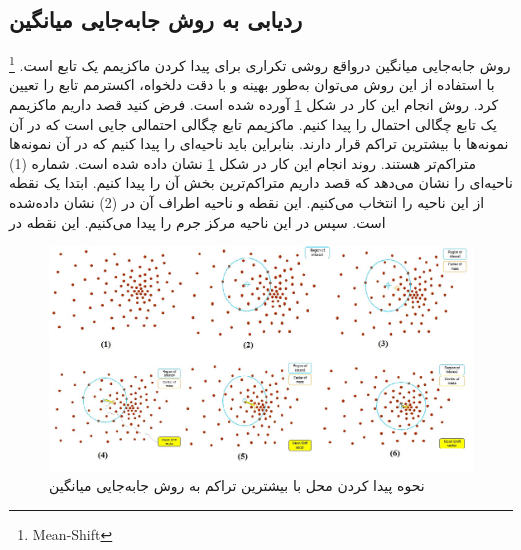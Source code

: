 \documentclass[paper=a4, fontsize=12pt]{article} %
\begin{document}
\subsection{ ردیابی به روش جابه‌جایی میانگین} 
\footnote{Mean-Shift}
روش جابه‌جایی میانگین درواقع روشی تکراری برای پیدا کردن ماکزیمم یک تابع است. با استفاده از این روش می‌توان به‌طور بهینه و با دقت دلخواه،  اکسترمم تابع را تعیین کرد. روش انجام این کار در شکل \ref{pic-3} آورده شده است.
فرض کنید قصد داریم ماکزیمم یک تابع چگالی احتمال را پیدا کنیم. ماکزیمم تابع چگالی احتمالی جایی است که در آن نمونه‌ها با بیشترین تراکم قرار دارند. بنابراین باید ناحیه‌ای را پیدا کنیم که در آن نمونه‌ها متراکم‌تر هستند. روند انجام این کار در شکل \ref{pic-3} نشان داده‌ شده است. شماره (1) ناحیه‌ای را نشان می‌دهد که قصد داریم متراکم‌ترین بخش آن را پیدا کنیم. ابتدا یک نقطه از این ناحیه را انتخاب می‌کنیم. این نقطه و ناحیه اطراف آن در (2) نشان داده‌شده است. سپس در این ناحیه مرکز جرم را پیدا می‌کنیم. این نقطه در 
\begin{figure}[h]
\centering
\includegraphics[width=12cm]{fig3.jpg}
\caption{ نحوه پیدا کردن محل با بیشترین تراکم به روش جابه‌جایی میانگین}
\label{pic-3}
\end{figure}
\end{document}
